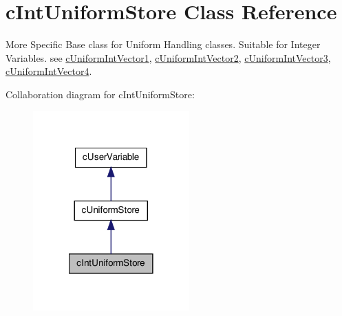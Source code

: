 \hypertarget{classc_int_uniform_store}{
\section{cIntUniformStore Class Reference}
\label{classc_int_uniform_store}
}


More Specific Base class for Uniform Handling classes. Suitable for Integer Variables. see \hyperlink{classc_uniform_int_vector1}{cUniformIntVector1}, \hyperlink{classc_uniform_int_vector2}{cUniformIntVector2}, \hyperlink{classc_uniform_int_vector3}{cUniformIntVector3}, \hyperlink{classc_uniform_int_vector4}{cUniformIntVector4}.  




Collaboration diagram for cIntUniformStore:\nopagebreak
\begin{figure}[H]
\begin{center}
\leavevmode
\includegraphics[width=170pt]{classc_int_uniform_store__coll__graph}
\end{center}
\end{figure}
